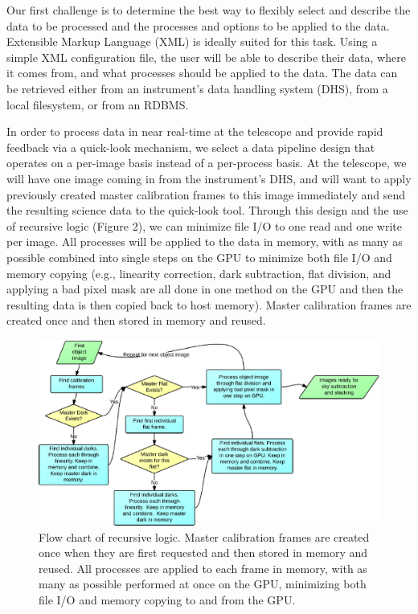 Our first challenge is to determine the best way to flexibly select and describe the data to be processed and the processes and options to be applied to the data.  Extensible Markup Language (XML) is ideally suited for this task.  Using a simple XML configuration file, the user will be able to describe their data, where it comes from, and what processes should be applied to the data.  The data can be retrieved either from an instrument's data handling system (DHS), from a local filesystem, or from an RDBMS.
 
In order to process data in near real-time at the telescope and provide rapid feedback via a quick-look mechanism, we select a data pipeline design that operates on a per-image basis instead of a per-process basis.  At the telescope, we will have one image coming in from the instrument's DHS, and will want to apply previously created master calibration frames to this image immediately and send the resulting science data to the quick-look tool. Through this design and the use of recursive logic (Figure 2), we can minimize file I/O to one read and one write per image.  All processes will be applied to the data in memory, with as many as possible combined into single steps on the GPU to minimize both file I/O and memory copying (e.g., linearity correction, dark subtraction, flat division, and applying a bad pixel mask are all done in one method on the GPU and then the resulting data is then copied back to host memory).  Master calibration frames are created once and then stored in memory and reused.

\begin{figure}[!ht]
\includegraphics[width=\textwidth]{part4/Warner_O31/O31_f2.eps}

\caption{Flow chart of recursive logic.  Master calibration frames are created once when they are first requested and then stored in memory and reused. All processes are applied to each frame in memory, with as many as possible performed at once on the GPU, minimizing both file I/O and memory copying to and from the GPU. }

\end{figure}


